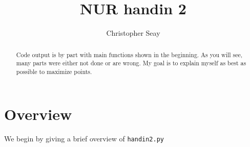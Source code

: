 \documentclass[a4paper,10pt]{article}
\title{NUR handin 2}
\author{Christopher Seay}
\begin{document}
\maketitle

\begin{abstract}
 Code output is by part with main functions shown in the beginning.
 As you will see, many parts were either not done or are wrong. 
 My goal is to explain myself as best as possible to maximize points.
\end{abstract}

\section{Overview}
 We begin by giving a brief overview of \texttt{handin2.py}
 




















% 

% 



% 

% 

% 

% 

% 

% 





% 
\end{document}
